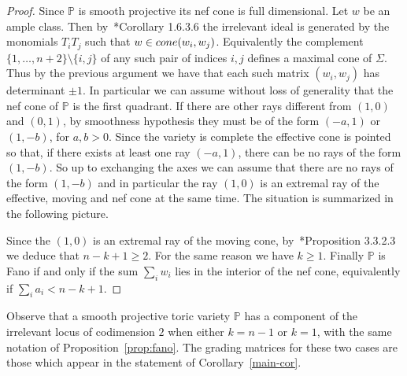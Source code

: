 \documentclass{amsart}
\theoremstyle{definition}
\theoremstyle{remark}
\begin{document}
\begin{proof}
Since $\mathbb P$ is smooth projective
its nef cone is full dimensional.
Let $w$ be an ample class. Then
by~\cite{adhl}*{Corollary 1.6.3.6}
the irrelevant ideal is generated by
the monomials $T_iT_j$ such that
$w\in{\rm cone}(w_i,w_j)$. Equivalently
the complement $\{1,\dots,n+2\}\setminus\{i,j\}$
of any such pair of indices $i,j$ defines
a maximal cone of $\Sigma$. Thus
by the previous argument we have
that each such matrix $(w_i,w_j)$
has determinant $\pm 1$.
In particular we can assume without loss of
generality that the nef cone of $\mathbb P$
is the first quadrant.
If there are other rays different from $(1,0)$ and
$(0,1)$, by smoothness hypothesis they must
be of the form $(-a,1)$ or $(1,-b)$, for $a,b > 0$.
Since the variety is complete the effective cone
is pointed so that, if there exists at least
one ray $(-a,1)$, there can be no rays of the form
$(1,-b)$. So up to exchanging the axes
we can assume that there are no
rays of the form $(1,-b)$ and in particular
the ray $(1,0)$ is an extremal ray of the
effective, moving and nef cone at the
same time. The situation is summarized
in the following picture.
 \begin{center}
 \end{center}
Since the $(1,0)$ is an extremal ray of the
moving cone, by~\cite{adhl}*{Proposition 3.3.2.3}
we deduce that $n-k+1\geq 2$. For the same reason
we have $k\geq 1$.
Finally $\mathbb P$ is Fano if and only if
the sum $\sum_iw_i$ lies in the
interior of the nef cone, equivalently
if $\sum_ia_i < n-k+1$.
\end{proof}

Observe that a smooth projective toric variety
$\mathbb P$ has a component of the irrelevant
locus of codimension $2$ when either $k=n-1$ or
$k=1$, with the same notation of
Proposition~\ref{prop:fano}.
The grading matrices for these two cases are
those which appear in the statement of
Corollary~\ref{main-cor}.
\end{document}
